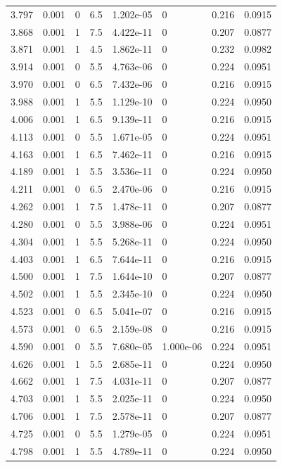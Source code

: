 \documentclass[preview]{standalone}
\begin{document}
{{{\begin{tabular}{L{1.2cm}C{1.2cm} C{0.3cm}C{0.5cm} C{1.4cm}C{1.4cm} C{1.4cm}C{1.4cm}}
  3.797  &  0.001  & 0     & 6.5 &  1.202e-05  & 0  & 0.216 &  0.0915   \\ 
  3.868  &  0.001  & 1     & 7.5 &  4.422e-11  & 0  & 0.207 &  0.0877   \\ 
  3.871  &  0.001  & 1     & 4.5 &  1.862e-11  & 0  & 0.232 &  0.0982   \\ 
  3.914  &  0.001  & 0     & 5.5 &  4.763e-06  & 0  & 0.224 &  0.0951   \\ 
  3.970  &  0.001  & 0     & 6.5 &  7.432e-06  & 0  & 0.216 &  0.0915   \\ 
  3.988  &  0.001  & 1     & 5.5 &  1.129e-10  & 0  & 0.224 &  0.0950   \\ 
  4.006  &  0.001  & 1     & 6.5 &  9.139e-11  & 0  & 0.216 &  0.0915   \\ 
  4.113  &  0.001  & 0     & 5.5 &  1.671e-05  & 0  & 0.224 &  0.0951   \\ 
  4.163  &  0.001  & 1     & 6.5 &  7.462e-11  & 0  & 0.216 &  0.0915   \\ 
  4.189  &  0.001  & 1     & 5.5 &  3.536e-11  & 0  & 0.224 &  0.0950   \\ 
  4.211  &  0.001  & 0     & 6.5 &  2.470e-06  & 0  & 0.216 &  0.0915   \\ 
  4.262  &  0.001  & 1     & 7.5 &  1.478e-11  & 0  & 0.207 &  0.0877   \\ 
  4.280  &  0.001  & 0     & 5.5 &  3.988e-06  & 0  & 0.224 &  0.0951   \\ 
  4.304  &  0.001  & 1     & 5.5 &  5.268e-11  & 0  & 0.224 &  0.0950   \\ 
  4.403  &  0.001  & 1     & 6.5 &  7.644e-11  & 0  & 0.216 &  0.0915   \\ 
  4.500  &  0.001  & 1     & 7.5 &  1.644e-10  & 0  & 0.207 &  0.0877   \\ 
  4.502  &  0.001  & 1     & 5.5 &  2.345e-10  & 0  & 0.224 &  0.0950   \\ 
  4.523  &  0.001  & 0     & 6.5 &  5.041e-07  & 0  & 0.216 &  0.0915   \\ 
  4.573  &  0.001  & 0     & 6.5 &  2.159e-08  & 0  & 0.216 &  0.0915   \\ 
  4.590  &  0.001  & 0     & 5.5 &  7.680e-05  & 1.000e-06  & 0.224 &  0.0951   \\ 
  4.626  &  0.001  & 1     & 5.5 &  2.685e-11  & 0  & 0.224 &  0.0950   \\ 
  4.662  &  0.001  & 1     & 7.5 &  4.031e-11  & 0  & 0.207 &  0.0877   \\ 
  4.703  &  0.001  & 1     & 5.5 &  2.025e-11  & 0  & 0.224 &  0.0950   \\ 
  4.706  &  0.001  & 1     & 7.5 &  2.578e-11  & 0  & 0.207 &  0.0877   \\ 
  4.725  &  0.001  & 0     & 5.5 &  1.279e-05  & 0  & 0.224 &  0.0951   \\ 
  4.798  &  0.001  & 1     & 5.5 &  4.789e-11  & 0  & 0.224 &  0.0950   \\ 
\hline 
\end{tabular} 

}}}
\end{document}

